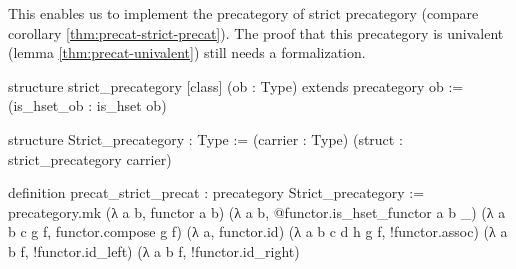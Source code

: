 This enables us to implement the precategory of strict precategory (compare
corollary \ref{thm:precat-strict-precat}).
The proof that this precategory is univalent (lemma \ref{thm:precat-univalent})
still needs a formalization.

\begin{leancode}
structure strict_precategory [class] (ob : Type) extends precategory ob :=
  (is_hset_ob : is_hset ob)

structure Strict_precategory : Type :=
  (carrier : Type)
  (struct : strict_precategory carrier)

definition precat_strict_precat : precategory Strict_precategory :=
precategory.mk (λ a b, functor a b)
  (λ a b, @functor.is_hset_functor a b _)
  (λ a b c g f, functor.compose g f)
  (λ a, functor.id)
  (λ a b c d h g f, !functor.assoc)
  (λ a b f, !functor.id_left)
  (λ a b f, !functor.id_right)
\end{leancode}

